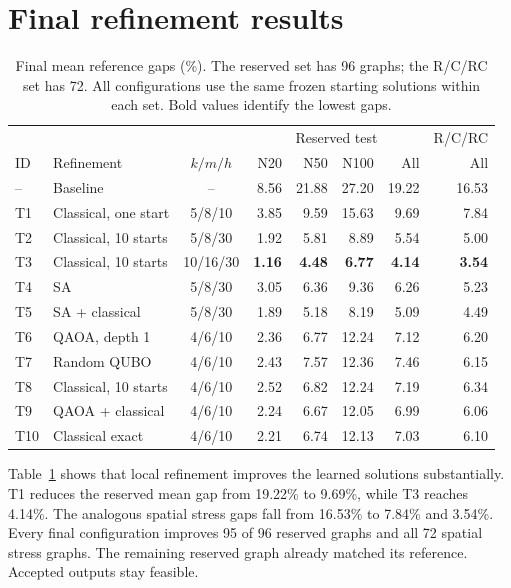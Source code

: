\documentclass[11pt,a4paper]{article}
\begin{document}
\section{Final refinement results}

\begin{table}[tbp]
\centering\small
\setlength{\tabcolsep}{3.5pt}
\caption{Final mean reference gaps (\%). The reserved set has 96 graphs;
the R/C/RC set has 72. All configurations use the same frozen starting
solutions within each set. Bold values identify the lowest gaps.}
\label{tab:final}
\begin{tabular}{@{}llcrrrrr@{}}
\toprule
 & & & \multicolumn{4}{c}{Reserved test} & R/C/RC\\
ID & Refinement & $k/m/h$ & N20 & N50 & N100 & All & All\\
\midrule
-- & Baseline & -- & 8.56 & 21.88 & 27.20 & 19.22 & 16.53\\
T1 & Classical, one start & 5/8/10 & 3.85 & 9.59 & 15.63 & 9.69 & 7.84\\
T2 & Classical, 10 starts & 5/8/30 & 1.92 & 5.81 & 8.89 & 5.54 & 5.00\\
T3 & Classical, 10 starts & 10/16/30 & \textbf{1.16} & \textbf{4.48} & \textbf{6.77} & \textbf{4.14} & \textbf{3.54}\\
T4 & SA & 5/8/30 & 3.05 & 6.36 & 9.36 & 6.26 & 5.23\\
T5 & SA + classical & 5/8/30 & 1.89 & 5.18 & 8.19 & 5.09 & 4.49\\
T6 & QAOA, depth 1 & 4/6/10 & 2.36 & 6.77 & 12.24 & 7.12 & 6.20\\
T7 & Random QUBO & 4/6/10 & 2.43 & 7.57 & 12.36 & 7.46 & 6.15\\
T8 & Classical, 10 starts & 4/6/10 & 2.52 & 6.82 & 12.24 & 7.19 & 6.34\\
T9 & QAOA + classical & 4/6/10 & 2.24 & 6.67 & 12.05 & 6.99 & 6.06\\
T10 & Classical exact & 4/6/10 & 2.21 & 6.74 & 12.13 & 7.03 & 6.10\\
\bottomrule
\end{tabular}
\end{table}

Table~\ref{tab:final} shows that local refinement improves the learned
solutions substantially. T1 reduces the reserved mean gap from 19.22\%
to 9.69\%, while T3 reaches 4.14\%. The analogous spatial stress gaps fall
from 16.53\% to 7.84\% and 3.54\%. Every final configuration improves
95 of 96 reserved graphs and all 72 spatial stress graphs. The remaining
reserved graph already matched its reference. Accepted outputs stay feasible.
\end{document}
